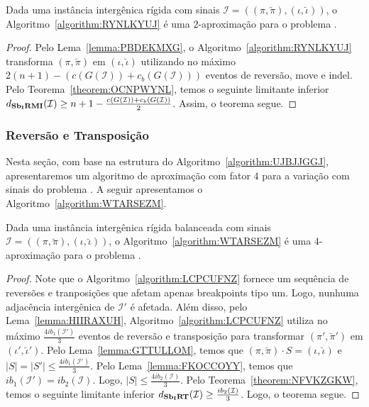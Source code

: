 \begin{theorem}\label{theorem:ICVGEGVZ}
Dada uma instância intergênica rígida com sinais $\mathcal{I}=((\pi,\breve\pi),(\iota,\breve\iota))$, o Algoritmo~\ref{algorithm:RYNLKYUJ} é uma $2$-aproximação para o problema \SbIRMI{}.
\end{theorem}
\begin{proof}
Pelo Lema~\ref{lemma:PBDEKMXG}, o Algoritmo~\ref{algorithm:RYNLKYUJ} transforma $(\pi,\breve\pi)$ em $(\iota,\breve\iota)$ utilizando no máximo $2(n + 1) - (c(G(\mathcal{I})) + c_b(G(\mathcal{I})))$ eventos de reversão, move e indel. Pelo Teorema~\ref{theorem:OCNPWYNL}, temos o seguinte limitante inferior $d_{\textbf{Sb\textsubscript{I}RMI}}(\mathcal{I}) \ge {n + 1} - \frac{c(G(\mathcal{I})) + c_b(G(\mathcal{I}))}{2}$. Assim, o teorema segue.
\end{proof}

\subsubsection{Reversão e Transposição}

Nesta seção, com base na estrutura do Algoritmo~\ref{algorithm:UJBJJGGJ}, apresentaremos um algoritmo de aproximação com fator $4$ para a variação com sinais do problema \SbIRT{}. A seguir apresentamos o Algoritmo~\ref{algorithm:WTARSEZM}.



\begin{theorem}\label{theorem:TRRZCTJT}
Dada uma instância intergênica rígida balanceada com sinais $\mathcal{I}=((\pi,\breve\pi),(\iota,\breve\iota))$, o Algoritmo~\ref{algorithm:WTARSEZM} é uma $4$-aproximação para o problema \SbIRT{}.
\end{theorem}
\begin{proof}
Note que o Algoritmo~\ref{algorithm:LCPCUFNZ} fornece um sequência de reversões e tranposições que afetam apenas breakpoints tipo um. Logo, nunhuma adjacência intergênica de $\mathcal{I'}$ é afetada. Além disso, pelo Lema~\ref{lemma:HIIRAXUH}, Algoritmo~\ref{algorithm:LCPCUFNZ} utiliza no máximo $\frac{4ib_1(\mathcal{I'})}{3}$ eventos de reversão e transposição para transformar $(\pi',\breve\pi')$ em $(\iota',\breve\iota')$. Pelo Lema~\ref{lemma:GTTULLOM}, temos que $(\pi,\breve\pi) \cdot S = (\iota,\breve\iota)$ e $|S| = |S'| \le \frac{4ib_1(\mathcal{I'})}{3}$. Pelo Lema~\ref{lemma:FKOCCOYY}, temos que $ib_1(\mathcal{I'}) = ib_2(\mathcal{I})$. Logo, $|S| \le \frac{4ib_2(\mathcal{I})}{3}$. Pelo Teorema~\ref{theorem:NFVKZGKW}, temos o seguinte limitante inferior $d_{\textbf{Sb\textsubscript{I}RT}}(\mathcal{I}) \ge \frac{ib_2(\mathcal{I})}{3}$. Logo, o teorema segue.
\end{proof}

